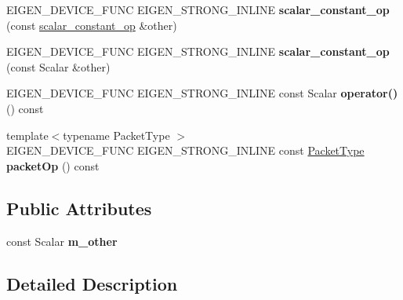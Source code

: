 \begin{DoxyCompactItemize}
\item 
\mbox{\label{struct_eigen_1_1internal_1_1scalar__constant__op_ab33f359bbcbe7a375f3e71ad62919cde}} 
E\+I\+G\+E\+N\+\_\+\+D\+E\+V\+I\+C\+E\+\_\+\+F\+U\+NC E\+I\+G\+E\+N\+\_\+\+S\+T\+R\+O\+N\+G\+\_\+\+I\+N\+L\+I\+NE {\bfseries scalar\+\_\+constant\+\_\+op} (const \hyperlink{struct_eigen_1_1internal_1_1scalar__constant__op}{scalar\+\_\+constant\+\_\+op} \&other)
\item 
\mbox{\label{struct_eigen_1_1internal_1_1scalar__constant__op_a40bf197abeae43e3478bdf1ca048a20d}} 
E\+I\+G\+E\+N\+\_\+\+D\+E\+V\+I\+C\+E\+\_\+\+F\+U\+NC E\+I\+G\+E\+N\+\_\+\+S\+T\+R\+O\+N\+G\+\_\+\+I\+N\+L\+I\+NE {\bfseries scalar\+\_\+constant\+\_\+op} (const Scalar \&other)
\item 
\mbox{\label{struct_eigen_1_1internal_1_1scalar__constant__op_a16de349a3938f7c7db6aac63c9619d41}} 
E\+I\+G\+E\+N\+\_\+\+D\+E\+V\+I\+C\+E\+\_\+\+F\+U\+NC E\+I\+G\+E\+N\+\_\+\+S\+T\+R\+O\+N\+G\+\_\+\+I\+N\+L\+I\+NE const Scalar {\bfseries operator()} () const
\item 
\mbox{\label{struct_eigen_1_1internal_1_1scalar__constant__op_a27e7079c0d1c983f98f2507d72d4c385}} 
{\footnotesize template$<$typename Packet\+Type $>$ }\\E\+I\+G\+E\+N\+\_\+\+D\+E\+V\+I\+C\+E\+\_\+\+F\+U\+NC E\+I\+G\+E\+N\+\_\+\+S\+T\+R\+O\+N\+G\+\_\+\+I\+N\+L\+I\+NE const \hyperlink{struct_eigen_1_1_packet_type}{Packet\+Type} {\bfseries packet\+Op} () const
\end{DoxyCompactItemize}
\subsection*{Public Attributes}
\begin{DoxyCompactItemize}
\item 
\mbox{\label{struct_eigen_1_1internal_1_1scalar__constant__op_aa47c9cdf21a888ae9fd86a96a6157424}} 
const Scalar {\bfseries m\+\_\+other}
\end{DoxyCompactItemize}


\subsection{Detailed Description}
